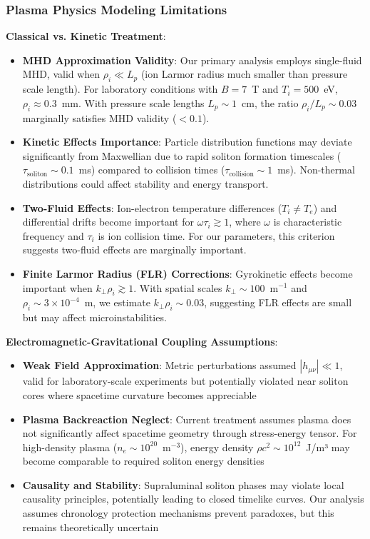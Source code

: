 \documentclass[12pt,a4paper]{article}
\begin{document}
\subsubsection{Plasma Physics Modeling Limitations}

\textbf{Classical vs. Kinetic Treatment}:
\begin{itemize}
\item \textbf{MHD Approximation Validity}: Our primary analysis employs single-fluid MHD, valid when $\rho_i \ll L_p$ (ion Larmor radius much smaller than pressure scale length). For laboratory conditions with $B = 7$~T and $T_i = 500$~eV, $\rho_i \approx 0.3$~mm. With pressure scale lengths $L_p \sim 1$~cm, the ratio $\rho_i/L_p \sim 0.03$ marginally satisfies MHD validity ($< 0.1$).
\item \textbf{Kinetic Effects Importance}: Particle distribution functions may deviate significantly from Maxwellian due to rapid soliton formation timescales ($\tau_{\text{soliton}} \sim 0.1$~ms) compared to collision times ($\tau_{\text{collision}} \sim 1$~ms). Non-thermal distributions could affect stability and energy transport.
\item \textbf{Two-Fluid Effects}: Ion-electron temperature differences ($T_i \neq T_e$) and differential drifts become important for $\omega \tau_i \gtrsim 1$, where $\omega$ is characteristic frequency and $\tau_i$ is ion collision time. For our parameters, this criterion suggests two-fluid effects are marginally important.
\item \textbf{Finite Larmor Radius (FLR) Corrections}: Gyrokinetic effects become important when $k_\perp \rho_i \gtrsim 1$. With spatial scales $k_\perp \sim 100$~m$^{-1}$ and $\rho_i \sim 3 \times 10^{-4}$~m, we estimate $k_\perp \rho_i \sim 0.03$, suggesting FLR effects are small but may affect microinstabilities.
\end{itemize}

\textbf{Electromagnetic-Gravitational Coupling Assumptions}:
\begin{itemize}
\item \textbf{Weak Field Approximation}: Metric perturbations assumed $|h_{\mu\nu}| \ll 1$, valid for laboratory-scale experiments but potentially violated near soliton cores where spacetime curvature becomes appreciable
\item \textbf{Plasma Backreaction Neglect}: Current treatment assumes plasma does not significantly affect spacetime geometry through stress-energy tensor. For high-density plasma ($n_e \sim 10^{20}$~m$^{-3}$), energy density $\rho c^2 \sim 10^{12}$~J/m³ may become comparable to required soliton energy densities
\item \textbf{Causality and Stability}: Supraluminal soliton phases may violate local causality principles, potentially leading to closed timelike curves. Our analysis assumes chronology protection mechanisms prevent paradoxes, but this remains theoretically uncertain
\end{itemize}
\end{document}
